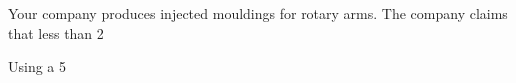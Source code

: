 




\item Your company produces injected mouldings for rotary arms. The company claims that less than 2%

Using a 5%
